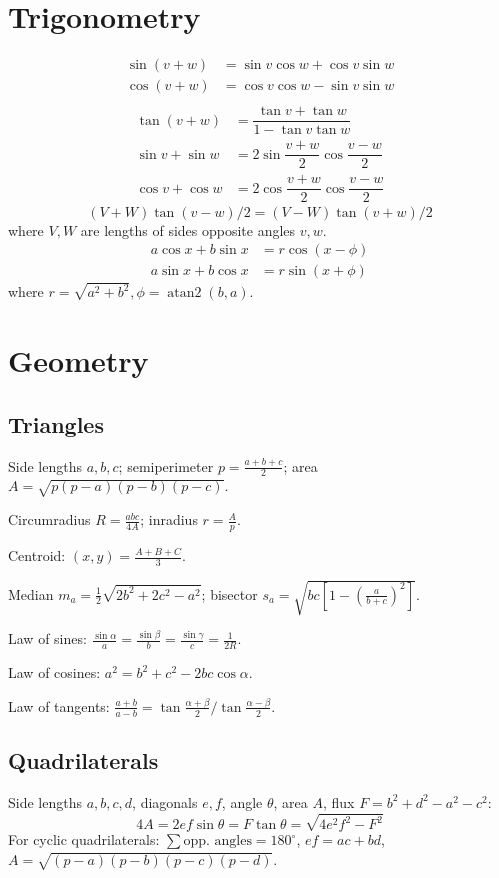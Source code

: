 \section{Trigonometry}
\begin{align*}
\sin(v+w)&{}=\sin v\cos w+\cos v\sin w\\
\cos(v+w)&{}=\cos v\cos w-\sin v\sin w\\
\end{align*}
\begin{align*}
\tan(v+w)&{}=\dfrac{\tan v+\tan w}{1-\tan v\tan w}\\
\sin v+\sin w&{}=2\sin\dfrac{v+w}{2}\cos\dfrac{v-w}{2}\\
\cos v+\cos w&{}=2\cos\dfrac{v+w}{2}\cos\dfrac{v-w}{2}
\end{align*}
\[ (V+W)\tan(v-w)/2{}=(V-W)\tan(v+w)/2 \]
where $V, W$ are lengths of sides opposite angles $v, w$.
\begin{align*}
	a\cos x+b\sin x&=r\cos(x-\phi)\\
	a\sin x+b\cos x&=r\sin(x+\phi)
\end{align*}
where $r=\sqrt{a^2+b^2}, \phi=\operatorname{atan2}(b,a)$.

\section{Geometry}

\subsection{Triangles}
Side lengths $a,b,c$; semiperimeter $p=\frac{a+b+c}{2}$; area $A=\sqrt{p(p-a)(p-b)(p-c)}$.

Circumradius $R=\frac{abc}{4A}$; inradius $r=\frac{A}{p}$.

Centroid: $(x,y) = \frac{A+B+C}{3}$.

Median $m_a=\frac{1}{2}\sqrt{2b^2+2c^2-a^2}$; bisector $s_a=\sqrt{bc[1-(\frac{a}{b+c})^2]}$.

Law of sines: $\frac{\sin\alpha}{a}=\frac{\sin\beta}{b}=\frac{\sin\gamma}{c}=\frac{1}{2R}$.

Law of cosines: $a^2=b^2+c^2-2bc\cos\alpha$.

Law of tangents: $\frac{a+b}{a-b}=\tan\frac{\alpha+\beta}{2} / \tan\frac{\alpha-\beta}{2}$.

\subsection{Quadrilaterals}
Side lengths $a,b,c,d$, diagonals $e,f$, angle $\theta$, area $A$, flux $F=b^2+d^2-a^2-c^2$:
\[ 4A = 2ef \sin\theta = F\tan\theta = \sqrt{4e^2f^2-F^2} \]
For cyclic quadrilaterals: $\sum \text{opp. angles} = 180^\circ$, $ef = ac + bd$, $A = \sqrt{(p-a)(p-b)(p-c)(p-d)}$.


